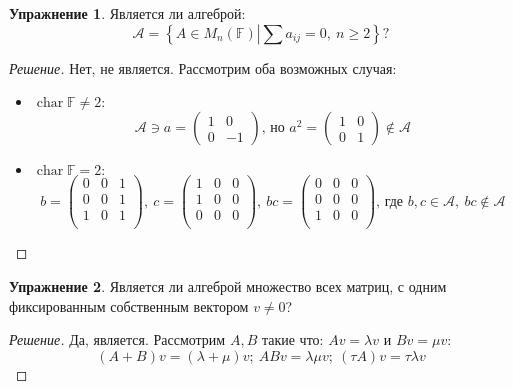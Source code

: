 \documentclass[a4paper, 14pt]{extarticle}
\theoremstyle{definition}
\newtheorem{exec}{Упражнение}
\begin{document}
\begin{exec}
	Является ли алгеброй: \[\mathcal{A} = \left\{ A \in M_n(\mathbb{F}) \left| \sum \right. a_{ij} = 0,\ n \geqslant 2 \right\} ?\]
\end{exec}

\begin{proof}[Решение]
	Нет, не является. Рассмотрим оба возможных случая:
	\begin{itemize}
		\item \(\operatorname{char} \mathbb{F} \neq 2:\)
		\[\mathcal{A} \ni a = \left(
			\begin{array}{cc}
				1&0\\
				0&-1
			\end{array}
		\right) \text{, но } a^2 = \left(
		\begin{array}{cc}
			1&0\\
			0&1
		\end{array}
		\right) \notin \mathcal{A}\]
		
		\item \(\operatorname{char} \mathbb{F} = 2:\)
		\[b = \left(
			\begin{array}{ccc}
				0&0&1\\
				0&0&1\\
				1&0&1\\
			\end{array}
		\right),\ c = \left(
		\begin{array}{ccc}
			1&0&0\\
			1&0&0\\
			0&0&0\\
		\end{array}
		\right),\ bc = \left(
		\begin{array}{ccc}
			0&0&0\\
			0&0&0\\
			1&0&0\\
		\end{array}
		\right) \text{, где } b, c \in \mathcal{A},\ bc \notin \mathcal{A}\]
	\end{itemize}
\end{proof}

\begin{exec}\label{ex1_2}
	Является ли алгеброй множество всех матриц, с одним фиксированным собственным вектором \(v \neq 0\)?
\end{exec}

\begin{proof}[Решение]
	Да, является. Рассмотрим \(A, B\) такие что: \(Av = \lambda v\) и \(Bv = \mu v:\)
	\[(A + B)v = (\lambda + \mu)v;\ ABv = \lambda\mu v;\ (\tau A)v = \tau\lambda v\]
\end{proof}
\end{document}
